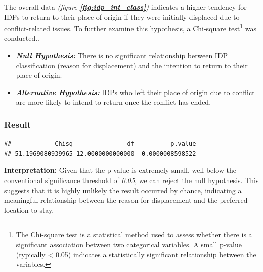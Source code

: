 \documentclass[
]{article}
\begin{document}
The overall data \emph{(figure
\textbf{\textcolor{blue}{\ref{fig:idp_int_class}}})} indicates a higher
tendency for IDPs to return to their place of origin if they were
initially displaced due to conflict-related issues. To further examine
this hypothesis, a Chi-square test\footnote{The Chi-square test is a
  statistical method used to assess whether there is a significant
  association between two categorical variables. A small p-value
  (typically \textless{} 0.05) indicates a statistically significant
  relationship between the variables.} was conducted..

\begin{itemize}
\item
  \textbf{\emph{Null Hypothesis:}} There is no significant relationship
  between IDP classification (reason for displacement) and the intention
  to return to their place of origin.
\item
  \textbf{\emph{Alternative Hypothesis:}} IDPs who left their place of
  origin due to conflict are more likely to intend to return once the
  conflict has ended.
\end{itemize}

\subsubsection{Result}\label{result}

\begin{verbatim}
##            Chisq               df          p.value 
## 51.1969080939965 12.0000000000000  0.0000008598522
\end{verbatim}

\textbf{Interpretation:} Given that the p-value is extremely small, well
below the conventional significance threshold of \emph{0.05}, we can
reject the null hypothesis. This suggests that it is highly unlikely the
result occurred by chance, indicating a meaningful relationship between
the reason for displacement and the preferred location to stay.
\end{document}
